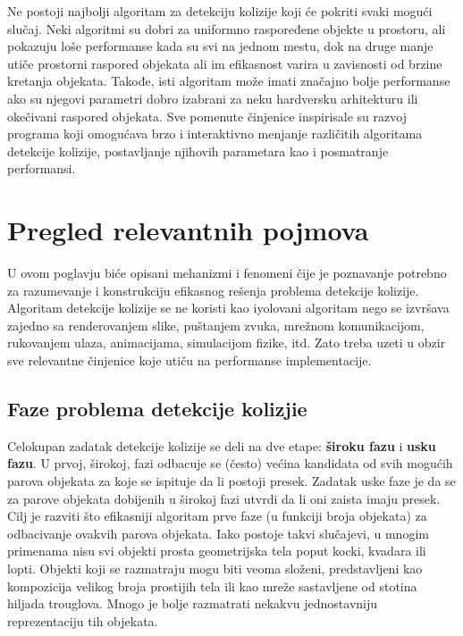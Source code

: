 \documentclass[12pt,oneside]{memoir}
\begin{document}
Ne postoji najbolji algoritam za detekciju kolizije koji će pokriti svaki mogući slučaj. 
Neki algoritmi su dobri za uniformno raspoređene objekte u prostoru, ali pokazuju loše performanse kada su svi na jednom mestu, 
dok na druge manje utiče prostorni raspored objekata ali im efikasnost varira u zavisnosti od brzine kretanja objekata.
Takođe, isti algoritam može imati značajno bolje performanse ako su njegovi parametri dobro 
izabrani za neku hardversku arhitekturu ili okečivani raspored objekata. 
Sve pomenute činjenice inspirisale su razvoj programa koji omogućava brzo i interaktivno menjanje različitih
algoritama detekcije kolizije, postavljanje njihovih parametara kao i posmatranje performansi.

\chapter{Pregled relevantnih pojmova}
\label{sec:karakteristike}

U ovom poglavju biće opisani mehanizmi i fenomeni čije je poznavanje potrebno za razumevanje i konstrukciju 
efikasnog rešenja problema detekcije kolizije.
Algoritam detekcije kolizije se ne koristi kao iyolovani algoritam nego se izvršava zajedno sa renderovanjem slike,
puštanjem zvuka, mrežnom komunikacijom, rukovanjem ulaza, animacijama, simulacijom fizike, itd. 
Zato treba uzeti u obzir sve relevantne činjenice koje utiču na performanse implementacije.

\section{Faze problema detekcije kolizjie}

Celokupan zadatak detekcije kolizije se deli na dve etape: \textbf{ široku fazu } i \textbf{usku fazu}. 
U prvoj, širokoj, fazi
odbacuje se (često) većina kandidata od svih mogućih parova objekata za koje se ispituje da li postoji presek.
Zadatak uske faze je da se za parove objekata dobijenih u širokoj fazi utvrdi da li oni zaista imaju presek.
Cilj je razviti što efikasniji algoritam prve faze (u funkciji broja objekata) za odbacivanje ovakvih parova objekata.
Iako postoje takvi slučajevi, u mnogim primenama nisu svi objekti prosta geometrijska tela poput kocki, kvadara ili lopti.
Objekti koji se razmatraju mogu biti veoma složeni, predstavljeni kao kompozicija velikog broja prostijih tela ili kao mreže sastavljene od stotina hiljada trouglova.
Mnogo je bolje razmatrati nekakvu jednostavniju reprezentaciju tih objekata.
\end{document}
